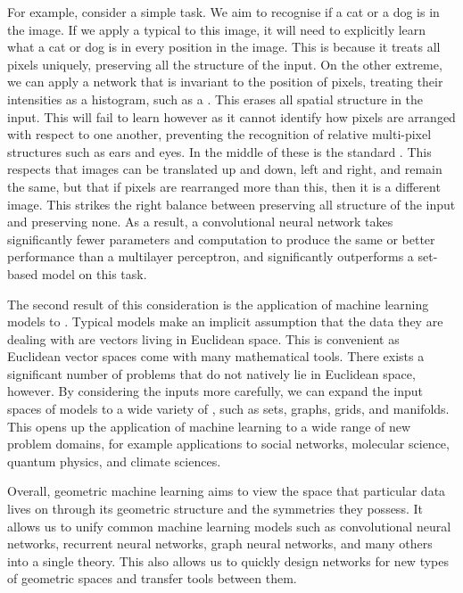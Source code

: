 For example, consider a simple  task.
We aim to recognise if a cat or a dog is in the image.
If we apply a typical  to this image, it will need to explicitly learn what a cat or dog is in every position in the image.
This is because it treats all pixels uniquely, preserving all the structure of the input.
On the other extreme, we can apply a network that is invariant to the position of pixels, treating their intensities as a histogram, such as a .
This erases all spatial structure in the input.
This will fail to learn however as it cannot identify how pixels are arranged with respect to one another, preventing the recognition of relative multi-pixel structures such as ears and eyes.
In the middle of these is the standard  \cite{lecun1989handwritten}.
This respects that images can be translated up and down, left and right, and remain the same, but that if pixels are rearranged more than this, then it is a different image.
This strikes the right balance between preserving all structure of the input and preserving none.
As a result, a convolutional neural network takes significantly fewer parameters and computation to produce the same or better performance than a multilayer perceptron, and significantly outperforms a set-based model on this task.

The second result of this consideration is the application of machine learning models to .
Typical models make an implicit assumption that the data they are dealing with are vectors living in Euclidean space.
This is convenient as Euclidean vector spaces come with many mathematical tools.
There exists a significant number of problems that do not natively lie in Euclidean space, however.
By considering the inputs more carefully, we can expand the input spaces of models to a wide variety of , such as sets, graphs, grids, and manifolds.
This opens up the application of machine learning to a wide range of new problem domains, for example applications to social networks, molecular science, quantum physics, and climate sciences.

Overall, geometric machine learning aims to view the space that particular data lives on through its geometric structure and the symmetries they possess.
It allows us to unify common machine learning models such as convolutional neural networks, recurrent neural networks, graph neural networks, and many others into a single theory.
This also allows us to quickly design networks for new types of geometric spaces and transfer tools between them.

